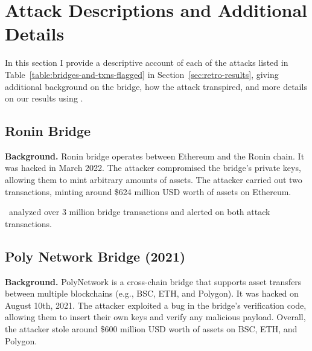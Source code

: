 \appendix

\newcommand{\bridgehash}[1]{\texttt{\zz#1\zz}}%
\def\zz#1{%
 \ifx\zz#1\else
   #1\linebreak[1]\expandafter\zz
 \fi}



\section{Attack Descriptions and Additional Details}
\label{sec:attack-summaries}

In this section I provide a descriptive account of each of the
attacks listed in Table~\ref{table:bridges-and-txns-flagged} in
Section~\ref{sec:retro-results}, giving additional background on the
bridge, how the attack transpired, and more details on our results
using \offlinetool.

\subsection{Ronin Bridge}
\textbf{Background.} Ronin bridge operates between Ethereum and the Ronin chain. It was hacked in March 2022. The attacker compromised the bridge's private keys, allowing them to mint arbitrary amounts of assets. The attacker carried out two transactions, minting around \$624 million USD worth of assets on Ethereum.

 \offlinetool~analyzed over 3 million bridge transactions and alerted on both attack transactions.

\subsection{Poly Network Bridge (2021)}
\textbf{Background.} PolyNetwork is a cross-chain bridge that supports asset transfers between multiple blockchains (e.g., BSC, ETH, and Polygon). It was hacked on August 10th, 2021. The attacker exploited a bug in the bridge's verification code, allowing them to insert their own keys and verify any malicious payload. Overall, the attacker stole around \$600 million USD worth of assets on BSC, ETH, and Polygon.

